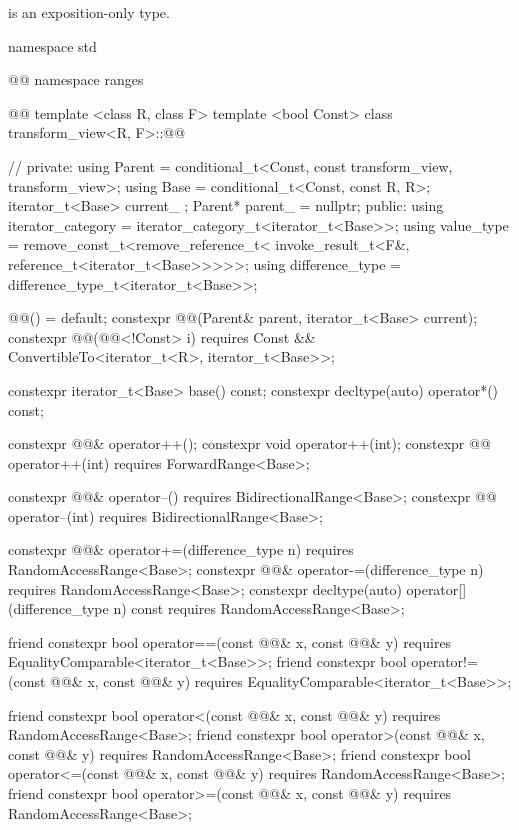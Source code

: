 \pnum
{} is an exposition-only type.

\begin{codeblock}
namespace std { @@ namespace ranges { @@
  template <class R, class F>
  template <bool Const>
  class transform_view<R, F>::@@ { // \expos
  private:
    using Parent = conditional_t<Const, const transform_view, transform_view>;
    using Base = conditional_t<Const, const R, R>;
    iterator_t<Base> current_ {};
    Parent* parent_ = nullptr;
  public:
    using iterator_category = iterator_category_t<iterator_t<Base>>;
    using value_type = remove_const_t<remove_reference_t<
        invoke_result_t<F&, reference_t<iterator_t<Base>>>>>;
    using difference_type = difference_type_t<iterator_t<Base>>;

    @@() = default;
    constexpr @@(Parent& parent, iterator_t<Base> current);
    constexpr @@(@@<!Const> i)
      requires Const && ConvertibleTo<iterator_t<R>, iterator_t<Base>>;

    constexpr iterator_t<Base> base() const;
    constexpr decltype(auto) operator*() const;

    constexpr @@& operator++();
    constexpr void operator++(int);
    constexpr @@ operator++(int) requires ForwardRange<Base>;

    constexpr @@& operator--() requires BidirectionalRange<Base>;
    constexpr @@ operator--(int) requires BidirectionalRange<Base>;

    constexpr @@& operator+=(difference_type n)
      requires RandomAccessRange<Base>;
    constexpr @@& operator-=(difference_type n)
      requires RandomAccessRange<Base>;
    constexpr decltype(auto) operator[](difference_type n) const
      requires RandomAccessRange<Base>;

    friend constexpr bool operator==(const @@& x, const @@& y)
      requires EqualityComparable<iterator_t<Base>>;
    friend constexpr bool operator!=(const @@& x, const @@& y)
      requires EqualityComparable<iterator_t<Base>>;

    friend constexpr bool operator<(const @@& x, const @@& y)
      requires RandomAccessRange<Base>;
    friend constexpr bool operator>(const @@& x, const @@& y)
      requires RandomAccessRange<Base>;
    friend constexpr bool operator<=(const @@& x, const @@& y)
      requires RandomAccessRange<Base>;
    friend constexpr bool operator>=(const @@& x, const @@& y)
      requires RandomAccessRange<Base>;

}}}
\end{codeblock}
